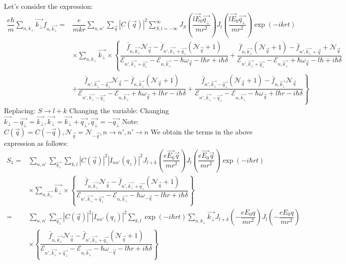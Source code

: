 \documentclass{article}
\begin{document}
Let's consider the expression: 
\begin{align*}
    \dfrac{e\hbar}{m}\sum_{n,k_\bot}\vec{k_\bot}f_{n,\vec{k_\bot}} =&  \dfrac{e}{mkr}\sum_{n,n'}\sum_{\vec{q}}\left|C\left(\vec{q} \right) \right|^2\sum^{\infty}_{S,l=-\infty}J_S \left(\dfrac{l\vec{E}_0\vec{q_\bot}}{mr^2} \right)J_l \left(\dfrac{l\vec{E}_0\vec{q_\bot}}{mr^2} \right) \exp(-ikrt)\\
    &\times \sum_{n,k_\bot}\vec{k_\bot}\times\left\{\dfrac{\bar{f}_{n,\vec{k_\bot}}\mathcal{N}_{\vec{q}}-\bar{f}_{n',\vec{k_\bot}+\vec{q_\bot}}\left(\mathcal{N}_{\vec{q}}+1\right)}{\mathcal{E}_{n',\vec{k_\bot}+\vec{q_\bot}}-\mathcal{E}_{n,\vec{k_\bot}}-\hbar\omega_{\vec{q}}-l\hbar r+i\hbar\delta} + \dfrac{\bar{f}_{n,\vec{k_\bot}}\left(\mathcal{N}_{\vec{q}}+1 \right)-\bar{f}_{n',\vec{k_\bot}+\vec{q}}+\mathcal{N}_{\vec{q}}}{\mathcal{E}_{n',\vec{k_\bot}+\vec{q_\bot}}-\mathcal{E}_{n,\vec{k_\bot}}+\hbar\omega_{\vec{q}}-l\hbar+i\hbar\delta}\right.\\
    &\left.+\dfrac{\bar{f}_{n',\vec{k_\bot}-\vec{q_\bot}}\mathcal{N}_{\vec{q}}-\bar{f}_{n,\vec{k_\bot}}\left(\mathcal{N}_{\vec{q}}+1\right)}{\mathcal{E}_{n',\vec{k_\bot}-\vec{q_\bot}}-\mathcal{E}_{n,\vec{k_\bot}}+\hbar\omega_{\vec{q}}+l\hbar r-i\hbar\delta} + \dfrac{\bar{f}_{n',\vec{k_\bot}-\vec{q_\bot}}\left(\mathcal{N}_{\vec{q}}+1\right)-\bar{f}_{n,\vec{k_\bot}}\mathcal{N}_{\vec{q}}}{\mathcal{E}_{n',\vec{k_\bot}-\vec{q_\bot}}-\mathcal{E}_{n,\vec{k_\bot}}-\hbar\omega_{\vec{q}}+l\hbar r-i\hbar\delta}\right\}
\end{align*}
Replacing: $S\to l +k $
Changing the variable: Changing $\vec{k_\bot}-\vec{q_\bot}=\vec{k_\bot},\vec{k_\bot}=\vec{k_\bot}+\vec{q_\bot},\vec{q_\bot}=-\vec{q_\bot}$
Note: $C\left(\vec{q}\right)=C\left(-\vec{q}\right),\mathcal{N}_{\vec{q}}=\mathcal{N}_{-\vec{q}},n\to n',n'\to n$
We obtain the terms in the above expression as follows:
\begin{align*}
    S_1=&\sum_{n,n'}\sum_{\vec{q_\bot}}\sum_{k,l}\left|C\left(\vec{q}\right) \right|^2\left|I_{nn'}\left(q_z \right) \right|^2 J_{l+k} \left(\dfrac{e\vec{E_0}\vec{q}}{mr^2}\right)J_{l} \left(\dfrac{e\vec{E_0}\vec{q}}{mr^2}\right)\exp(-i\hbar r t)\\
    & \times\sum_{n,\vec{k_\bot}}\vec{k_\bot}\times\left\{\dfrac{\bar{f}_{n,\vec{k_\bot}}\mathcal{N}_{\vec{q}}-\bar{f}_{n',\vec{k_\bot}+\vec{q_\bot}}\left(\mathcal{N}_{\vec{q}}+1 \right)}{\mathcal{E}_{n',\vec{k_\bot}+\vec{q_\bot}}-\mathcal{E}_{n,\vec{k_\bot}}-\hbar\omega_{-\vec{q}}-l\hbar r+i\hbar\delta}\right\}\\
    = &\sum_{n,n'}\sum_{\vec{q_\bot}}\left|C\left(\vec{q}\right) \right|^2\left|I_{nn'}\left(q_z \right) \right|^2\sum_{k,l}\exp(-i\hbar r t)\sum_{n,k_\bot}\vec{k_\bot} J_{l+k} \left(-\dfrac{eE_0q}{mr^2}\right)J_{l} \left(-\dfrac{eE_0q}{mr^2}\right)\\
    &\times\left\{\dfrac{\bar{f}_{n,\vec{k_\bot}}\mathcal{N}_{\vec{q}}-\bar{f}_{n',\vec{k_\bot}+\vec{q_\bot}}\left(\mathcal{N}_{\vec{q}}+1 \right)}{\mathcal{E}_{n',\vec{k_\bot}+\vec{q_\bot}}-\mathcal{E}_{n,\vec{k_\bot}}-\hbar\omega_{-\vec{q}}-l\hbar r+i\hbar\delta}\right\}
\end{align*}
\end{document}
